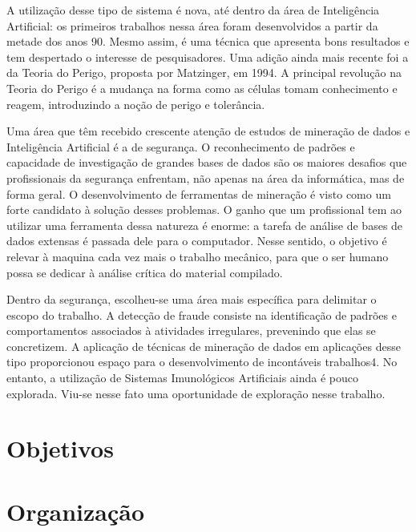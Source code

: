 A utilização desse tipo de sistema é nova, até dentro da área de Inteligência Artificial: os primeiros trabalhos nessa área foram desenvolvidos a partir da metade dos anos 90. Mesmo assim, é uma técnica que apresenta bons resultados e tem despertado o interesse de pesquisadores. Uma adição ainda mais recente foi a da Teoria do Perigo, proposta por Matzinger, em 1994. A principal revolução na Teoria do Perigo é a mudança na forma como as células tomam conhecimento e reagem, introduzindo a noção de perigo e tolerância.

Uma área que têm recebido crescente atenção de estudos de mineração de dados e Inteligência Artificial é a de segurança. O reconhecimento de padrões e capacidade de investigação de grandes bases de dados são os maiores desafios que profissionais da segurança enfrentam, não apenas na área da informática, mas de forma geral. O desenvolvimento de ferramentas de mineração é visto como um forte candidato à solução desses problemas. O ganho que um profissional tem ao utilizar uma ferramenta dessa natureza é enorme: a tarefa de análise de bases de dados extensas é passada dele para o computador. Nesse sentido, o objetivo é relevar à maquina cada vez mais o trabalho mecânico, para que o ser humano possa se dedicar à análise crítica do material compilado.

Dentro da segurança, escolheu-se uma área mais específica para delimitar o escopo do trabalho. A detecção de fraude consiste na identificação de padrões e comportamentos associados à atividades irregulares, prevenindo que elas se concretizem. A aplicação de técnicas de mineração de dados em aplicações desse tipo proporcionou espaço para o desenvolvimento de incontáveis trabalhos4. No entanto, a utilização de Sistemas Imunológicos Artificiais ainda é pouco explorada. Viu-se nesse fato uma oportunidade de exploração nesse trabalho.

\section{Objetivos}
\section{Organização}

